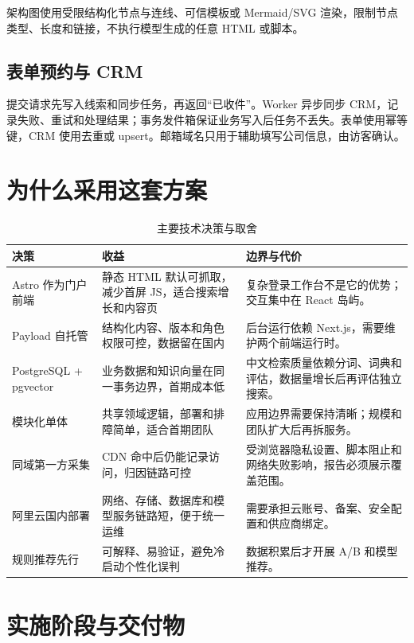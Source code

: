 \documentclass[UTF8,zihao=-4,a4paper]{ctexart}
\begin{document}
架构图使用受限结构化节点与连线、可信模板或 Mermaid/SVG 渲染，限制节点类型、长度和链接，不执行模型生成的任意 HTML 或脚本。

\subsection{表单预约与 CRM}
提交请求先写入线索和同步任务，再返回“已收件”。Worker 异步同步 CRM，记录失败、重试和处理结果；事务发件箱保证业务写入后任务不丢失。表单使用幂等键，CRM 使用去重或 upsert。邮箱域名只用于辅助填写公司信息，由访客确认。

\section{为什么采用这套方案}

\begin{longtable}{P{35mm}P{55mm}Y}
\caption{主要技术决策与取舍}\\
\toprule
\textbf{决策} & \textbf{收益} & \textbf{边界与代价}\\
\midrule
Astro 作为门户前端 & 静态 HTML 默认可抓取，减少首屏 JS，适合搜索增长和内容页 & 复杂登录工作台不是它的优势；交互集中在 React 岛屿。\\
Payload 自托管 & 结构化内容、版本和角色权限可控，数据留在国内 & 后台运行依赖 Next.js，需要维护两个前端运行时。\\
PostgreSQL + pgvector & 业务数据和知识向量在同一事务边界，首期成本低 & 中文检索质量依赖分词、词典和评估，数据量增长后再评估独立搜索。\\
模块化单体 & 共享领域逻辑，部署和排障简单，适合首期团队 & 应用边界需要保持清晰；规模和团队扩大后再拆服务。\\
同域第一方采集 & CDN 命中后仍能记录访问，归因链路可控 & 受浏览器隐私设置、脚本阻止和网络失败影响，报告必须展示覆盖范围。\\
阿里云国内部署 & 网络、存储、数据库和模型服务链路短，便于统一运维 & 需要承担云账号、备案、安全配置和供应商绑定。\\
规则推荐先行 & 可解释、易验证，避免冷启动个性化误判 & 数据积累后才开展 A/B 和模型推荐。\\
\bottomrule
\end{longtable}

\section{实施阶段与交付物}
\end{document}
